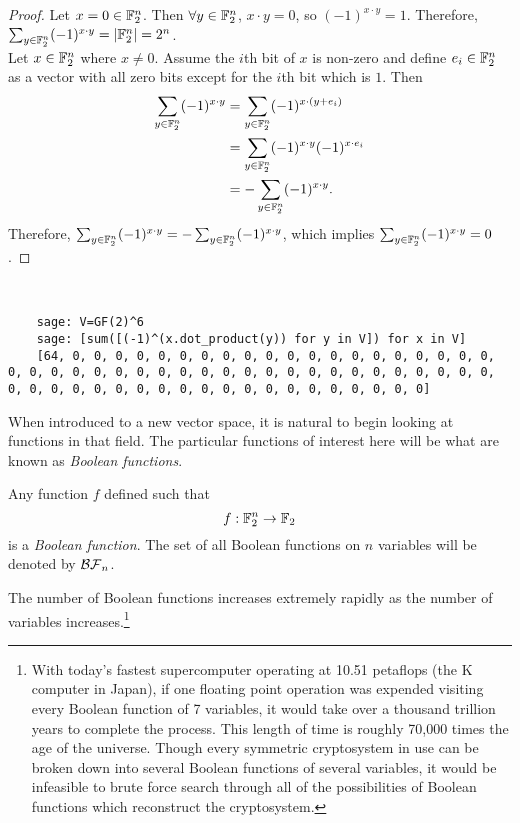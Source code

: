\begin{proof}
  Let $x=0\in\mathbb{F}_2^n$. Then $\forall y\in\mathbb{F}_2^n$, $x\cdot y=0$, so
  $(-1)^{x\cdot y}=1$. Therefore, $\sum_{y\in\mathbb{F}_2^n}(-1)^{x\cdot y}=
  \allowbreak\lvert\mathbb{F}_2^n\rvert=\allowbreak 2^n$. \\

  Let $x\in\mathbb{F}_2^n$ where $x\not=0$. Assume the $i$th bit of $x$ is
  non-zero and define $e_i\in\mathbb{F}_2^n$ as a vector with all zero bits
  except for the $i$th bit which is $1$. Then
  \begin{align*}
    \sum_{y\in\mathbb{F}_2^n}(-1)^{x\cdot y}
      &= \sum_{y\in\mathbb{F}_2^n}(-1)^{x\cdot (y+e_i)} \\
      &= \sum_{y\in\mathbb{F}_2^n}(-1)^{x\cdot y}(-1)^{x\cdot e_i} \\
      &= -\sum_{y\in\mathbb{F}_2^n}(-1)^{x\cdot y}.
  \end{align*}
  Therefore, $\sum_{y\in\mathbb{F}_2^n}(-1)^{x\cdot y}=\allowbreak
  -\sum_{y\in\mathbb{F}_2^n}(-1)^{x\cdot y}$, which implies
  $\sum_{y\in\mathbb{F}_2^n}(-1)^{x\cdot y}=0$.
\end{proof}

\begin{example}
  \ 
  \begin{lstlisting}
    sage: V=GF(2)^6
    sage: [sum([(-1)^(x.dot_product(y)) for y in V]) for x in V]
    [64, 0, 0, 0, 0, 0, 0, 0, 0, 0, 0, 0, 0, 0, 0, 0, 0, 0, 0, 0, 0, 0, 0, 0, 0, 0, 0, 0, 0, 0, 0, 0, 0, 0, 0, 0, 0, 0, 0, 0, 0, 0, 0, 0, 0, 0, 0, 0, 0, 0, 0, 0, 0, 0, 0, 0, 0, 0, 0, 0, 0, 0, 0, 0]
  \end{lstlisting}
\end{example}

\par When introduced to a new vector space, it is natural to begin looking
at functions in that field. The particular functions of interest here will
be what are known as {\em Boolean functions}.

\begin{definition}
\label{def:boolean-function}
  Any function $f$ defined such that 
  \begin{equation*}
    f:\mathbb{F}_2^n\rightarrow\mathbb{F}_2
  \end{equation*}
  is a {\em Boolean function}. The set of all Boolean functions on $n$
  variables will be denoted by $\mathcal{BF}_n$.
\end{definition}

\par The number of Boolean functions increases extremely rapidly as the
number of variables increases.\footnote{With today's fastest supercomputer
operating at 10.51 petaflops (the K computer in Japan), if one floating
point operation was expended visiting every Boolean function of 7 variables,
it would take over a thousand trillion years to complete the process. This
length of time is roughly 70,000 times the age of the universe. Though
every symmetric cryptosystem in use can be broken down into several Boolean
functions of several variables, it would be infeasible to brute force search
through all of the possibilities of Boolean functions which reconstruct the
cryptosystem.}

